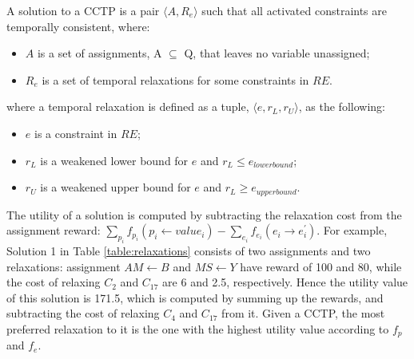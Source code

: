 \documentclass[jair,twoside,11pt,theapa]{article}
\begin{document}
\begin{mydef}
	A solution to a CCTP is a pair $\langle A,R_e\rangle$ such that all activated constraints are temporally consistent, where:
	\begin{itemize}		
		\item $A$ is a set of assignments, A $\subseteq$ Q, that leaves no variable unassigned;
		\item $R_e$ is a set of temporal relaxations for some constraints in $RE$.
	\end{itemize}
\end{mydef}

%
%

where a temporal relaxation is defined as a tuple, $\langle e,r_L,r_U\rangle$, as the following:

\begin{itemize}		
	\item $e$ is a constraint in $RE$;
	
	
	\item $r_L$ is a weakened lower bound for $e$ and $r_L\leq e_{lowerbound}$;
	\item $r_U$ is a weakened upper bound for $e$ and $r_L\geq e_{upperbound}$.
\end{itemize}




The utility of a solution is computed by subtracting the relaxation cost from
the assignment reward: $\sum_{p_i}f_{p_i}(p_i\leftarrow
value_i)-\sum_{e_i}f_{e_i}(e_i\rightarrow e_i^{\prime})$.  For example, Solution
1 in Table \ref{table:relaxations} consists of two assignments and two
relaxations: assignment $AM\leftarrow B$ and $MS\leftarrow Y$ have reward of 100
and 80, while the cost of relaxing $C_2$ and $C_{17}$ are 6 and 2.5,
respectively. Hence the utility value of this solution is 171.5, which is
computed by summing up the rewards, and subtracting the cost of relaxing $C_4$
and $C_{17}$ from it. Given a CCTP, the most preferred relaxation to it is
the one with the highest utility value according to $f_p$ and $f_e$.
\end{document}
